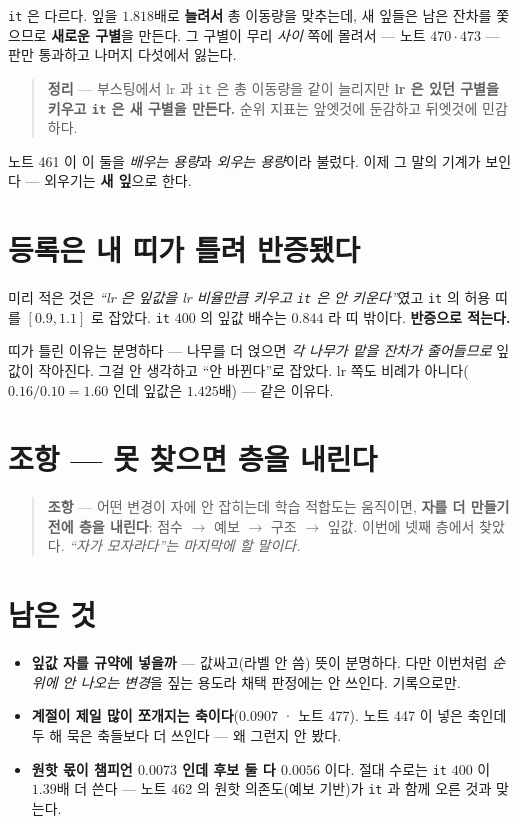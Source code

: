 \documentclass[11pt]{article}
\begin{document}
\texttt{it} 은 다르다. 잎을 $1.818$배로 \textbf{늘려서} 총 이동량을
맞추는데, 새 잎들은 남은 잔차를 쫓으므로 \textbf{새로운 구별}을 만든다.
그 구별이 무리 \emph{사이} 쪽에 몰려서 --- 노트 $470 \cdot 473$ --- 판만
통과하고 나머지 다섯에서 잃는다.

\begin{quote}
\textbf{정리} --- 부스팅에서 lr 과 \texttt{it} 은 총 이동량을 같이
늘리지만 \textbf{lr 은 있던 구별을 키우고 \texttt{it} 은 새 구별을
만든다.} 순위 지표는 앞엣것에 둔감하고 뒤엣것에 민감하다.
\end{quote}

노트 461 이 이 둘을 \emph{배우는 용량}과 \emph{외우는 용량}이라 불렀다.
이제 그 말의 기계가 보인다 --- 외우기는 \textbf{새 잎}으로 한다.

\section{등록은 내 띠가 틀려 반증됐다}

미리 적은 것은 \emph{``lr 은 잎값을 lr 비율만큼 키우고 \texttt{it} 은
안 키운다''}였고 \texttt{it} 의 허용 띠를 $[0.9, 1.1]$ 로 잡았다.
\texttt{it} $400$ 의 잎값 배수는 $0.844$ 라 띠 밖이다. \textbf{반증으로
적는다.}

띠가 틀린 이유는 분명하다 --- 나무를 더 얹으면 \emph{각 나무가 맡을
잔차가 줄어들므로} 잎값이 작아진다. 그걸 안 생각하고 ``안 바뀐다''로
잡았다. lr 쪽도 비례가 아니다($0.16/0.10 = 1.60$ 인데 잎값은 $1.425$배)
--- 같은 이유다.

\section*{조항 --- 못 찾으면 층을 내린다}

\begin{quote}
\textbf{조항} --- 어떤 변경이 자에 안 잡히는데 학습 적합도는 움직이면,
\textbf{자를 더 만들기 전에 층을 내린다}: 점수 $\to$ 예보 $\to$ 구조
$\to$ 잎값. 이번에 넷째 층에서 찾았다. \emph{``자가 모자라다''는 마지막에
할 말이다.}
\end{quote}

\section*{남은 것}

\begin{itemize}
\item \textbf{잎값 자를 규약에 넣을까} --- 값싸고(라벨 안 씀) 뜻이
분명하다. 다만 이번처럼 \emph{순위에 안 나오는 변경}을 짚는 용도라
채택 판정에는 안 쓰인다. 기록으로만.
\item \textbf{계절이 제일 많이 쪼개지는 축이다}($0.0907$ · 노트 477).
노트 447 이 넣은 축인데 두 해 묵은 축들보다 더 쓰인다 --- 왜 그런지
안 봤다.
\item \textbf{원핫 몫이 챔피언 $0.0073$ 인데 후보 둘 다 $0.0056$} 이다.
절대 수로는 \texttt{it} $400$ 이 $1.39$배 더 쓴다 --- 노트 462 의
원핫 의존도(예보 기반)가 \texttt{it} 과 함께 오른 것과 맞는다.
\end{itemize}
\end{document}
